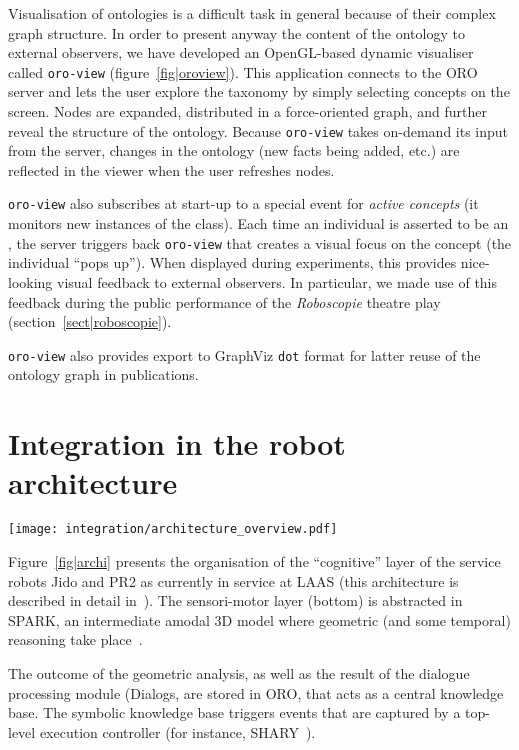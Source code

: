Visualisation of ontologies is a difficult task in general because of their
complex graph structure. In order to present anyway the content of the ontology
to external observers, we have developed an OpenGL-based dynamic visualiser
called {\tt oro-view} (figure~\ref{fig|oroview}). This application connects to
the ORO server and lets the user explore the taxonomy by simply selecting
concepts on the screen. Nodes are expanded, distributed in a force-oriented
graph, and further reveal the structure of the ontology. Because {\tt oro-view}
takes on-demand its input from the server, changes in the ontology (new facts
being added, etc.) are reflected in the viewer when the user refreshes nodes.

{\tt oro-view} also subscribes at start-up to a special event for \emph{active
concepts} (\ie it monitors new instances of the  class).
Each time an individual is asserted to be an , the
server triggers back {\tt oro-view} that creates a visual focus on the concept
(the individual ``pops up''). When displayed during experiments, this provides
nice-looking visual feedback to external observers. In particular, we made use
of this feedback during the public performance of the \emph{Roboscopie} theatre
play (section~\ref{sect|roboscopie}).

{\tt oro-view} also provides export to GraphViz {\tt dot} format for latter
reuse of the ontology graph in publications.

\section{Integration in the robot architecture}

\begin{figure*}[thpb]
  \centering
  \texttt{[image: integration/architecture\_overview.pdf]}
  \caption {Software architecture for a service robot interacting with humans.}
  \label{fig|archi}
\end{figure*}

Figure~\ref{fig|archi} presents the organisation of the ``cognitive'' layer of
the service robots Jido and PR2 as currently in service at LAAS (this
architecture is described in detail in~\cite{Alami2011}). The sensori-motor
layer (bottom) is abstracted in SPARK, an intermediate amodal 3D model where
geometric (and some temporal) reasoning take place~\cite{Sisbot2011}.

The outcome of the geometric analysis, as well as the result of the dialogue
processing module ({\sc Dialogs}, are stored in ORO, that acts as a central
knowledge base. The symbolic knowledge base triggers events that are captured
by a top-level execution controller (for instance, SHARY~\cite{Warnier2012}).

